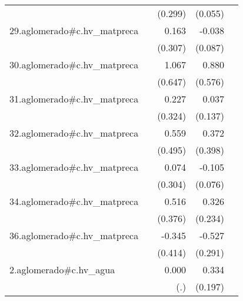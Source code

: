 {\begin{longtable}{l*{4}{D{.}{.}{-1}}}
            &                     &     (0.299)         &     (0.055)         &                     \\
\addlinespace
29.aglomerado#c.hv\_matpreca&                     &       0.163         &      -0.038         &                     \\
            &                     &     (0.307)         &     (0.087)         &                     \\
\addlinespace
30.aglomerado#c.hv\_matpreca&                     &       1.067         &       0.880         &                     \\
            &                     &     (0.647)         &     (0.576)         &                     \\
\addlinespace
31.aglomerado#c.hv\_matpreca&                     &       0.227         &       0.037         &                     \\
            &                     &     (0.324)         &     (0.137)         &                     \\
\addlinespace
32.aglomerado#c.hv\_matpreca&                     &       0.559         &       0.372         &                     \\
            &                     &     (0.495)         &     (0.398)         &                     \\
\addlinespace
33.aglomerado#c.hv\_matpreca&                     &       0.074         &      -0.105         &                     \\
            &                     &     (0.304)         &     (0.076)         &                     \\
\addlinespace
34.aglomerado#c.hv\_matpreca&                     &       0.516         &       0.326         &                     \\
            &                     &     (0.376)         &     (0.234)         &                     \\
\addlinespace
36.aglomerado#c.hv\_matpreca&                     &      -0.345         &      -0.527         &                     \\
            &                     &     (0.414)         &     (0.291)         &                     \\
\addlinespace
2.aglomerado#c.hv\_agua&                     &       0.000         &       0.334         &                     \\
            &                     &         (.)         &     (0.197)         &                     \\

\end{longtable}}
